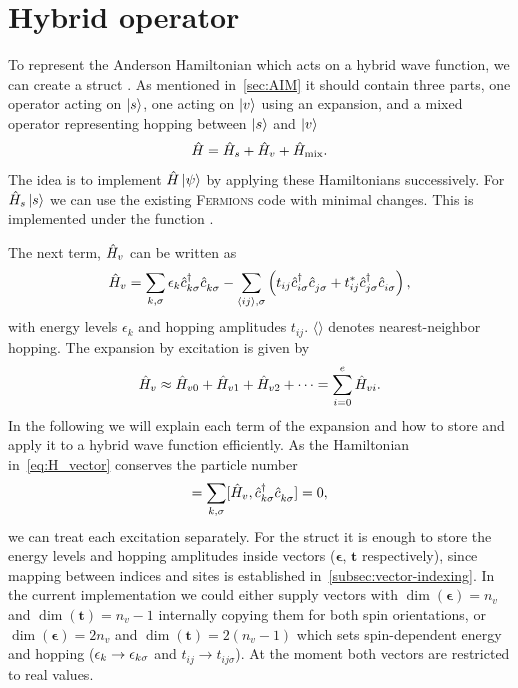 \section{Hybrid operator}

To represent the Anderson Hamiltonian which acts on a hybrid wave function,
we can create a struct .
As mentioned in~\cref{sec:AIM} it should contain three parts,
one operator acting on $\ket{s}$,
one acting on $\ket{v}$ using an expansion,
and a mixed operator representing hopping between
$\ket{s}$ and $\ket{v}$
\begin{equation}
    \label{eq:hamiltonian-split}
    \hat{H} = \hat{H}_s  + \hat{H}_v + \hat{H}_{\mathrm{mix}}.
\end{equation}
The idea is to implement $\hat{H}\ket{\psi}$
by applying these Hamiltonians successively.
For $\hat{H}_s\ket{s}$ we can use the existing \textsc{Fermions} code
with minimal changes.
This is implemented under the function .

The next term, $\hat{H}_v$ can be written as
\begin{equation}
    \ham_v =
    \sum_{k,\sigma} \epsilon_k \cdag\ks \cc\ks
    - \sum_{\langle ij \rangle, \sigma} \left(
    t_{ij} \cdag_{i\sigma} \cc_{j\sigma}
    + t_{ij}^* \cdag_{j\sigma} \cc_{i\sigma} \right),
    \label{eq:H_vector}
\end{equation}
with energy levels $\epsilon_k$ and hopping amplitudes $t_{ij}$.
$\langle\rangle$ denotes nearest-neighbor hopping.
The expansion by excitation is given by
\begin{equation}
    \hat{H}_v
    \approx \hat{H}_{v0} + \hat{H}_{v1} + \hat{H}_{v2} + \cdots
    = \sum_{i=0}^e \hat{H}_{vi}.
\end{equation}
In the following we will explain each term of the expansion
and how to store and apply it to a hybrid wave function efficiently.
As the Hamiltonian in~\cref{eq:H_vector} conserves the particle number
\begin{equation}
    [\ham_v, \hat{N}] = \sum_{k, \sigma} [\ham_v, \cdag\ks \cc\ks] = 0,
\end{equation}
we can treat each excitation separately.
For the struct it is enough to store the energy levels
and hopping amplitudes inside vectors
($\symbf{\epsilon}$, $\mathbf{t}$ respectively),
since mapping between indices and sites is established
in~\cref{subsec:vector-indexing}.
In the current implementation
we could either supply vectors with
$\dim(\symbf{\epsilon}) = n_v$ and $\dim(\mathbf{t}) = n_v - 1$
internally copying them for both spin orientations,
or $\dim(\symbf{\epsilon}) = 2n_v$ and
$\dim(\mathbf{t}) = 2(n_v - 1)$ which sets spin-dependent energy and hopping
($\epsilon_k \rightarrow \epsilon_{k\sigma}$ and $t_{ij} \rightarrow t_{ij\sigma}$).
At the moment both vectors are restricted to real values.

